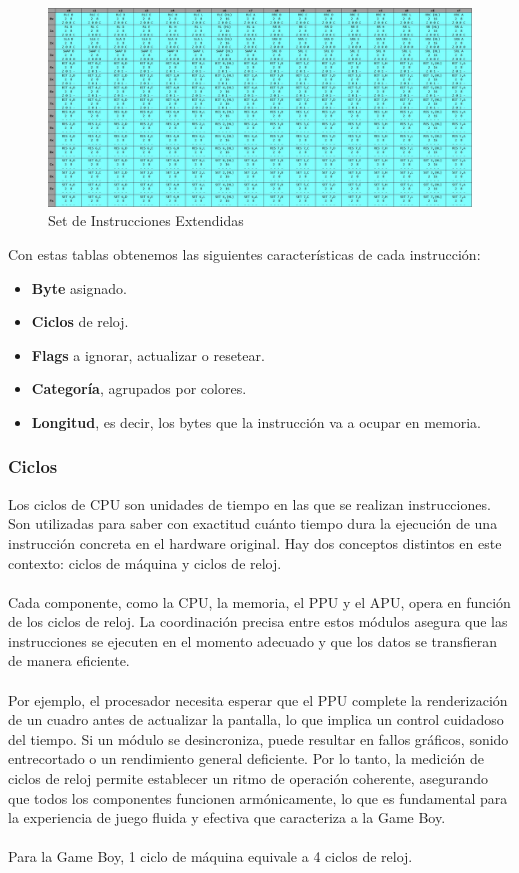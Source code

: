 \begin{figure}[H]
\centering
\includegraphics[width=1\textwidth]{include/images/opcodes_2.jpg}
\caption{Set de Instrucciones Extendidas}
\label{figure:opcodes_2}
\end{figure}

Con estas tablas obtenemos las siguientes características de cada instrucción:
\begin{itemize}
    \item \textbf{Byte} asignado.
    \item \textbf{Ciclos} de reloj.
    \item \textbf{Flags} a ignorar, actualizar o resetear.
    \item \textbf{Categoría}, agrupados por colores.
    \item \textbf{Longitud}, es decir, los bytes que la instrucción va a ocupar en memoria.
\end{itemize}

\subsubsection{Ciclos}

Los ciclos de CPU son unidades de tiempo en las que se realizan instrucciones. Son utilizadas para saber con exactitud cuánto tiempo dura la ejecución de una instrucción concreta en el hardware original. Hay dos conceptos distintos en este contexto: ciclos de máquina y ciclos de reloj.
\\\\
Cada componente, como la CPU, la memoria, el PPU y el APU, opera en función de los ciclos de reloj. La coordinación precisa entre estos módulos asegura que las instrucciones se ejecuten en el momento adecuado y que los datos se transfieran de manera eficiente.
\\\\
Por ejemplo, el procesador necesita esperar que el PPU complete la renderización de un cuadro antes de actualizar la pantalla, lo que implica un control cuidadoso del tiempo. Si un módulo se desincroniza, puede resultar en fallos gráficos, sonido entrecortado o un rendimiento general deficiente. Por lo tanto, la medición de ciclos de reloj permite establecer un ritmo de operación coherente, asegurando que todos los componentes funcionen armónicamente, lo que es fundamental para la experiencia de juego fluida y efectiva que caracteriza a la Game Boy.
\\\\
Para la Game Boy, 1 ciclo de máquina equivale a 4 ciclos de reloj.

